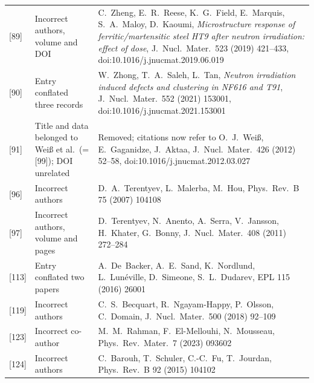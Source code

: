 \documentclass{article}
\begin{document}
\begin{itemize}
{\begin{longtable}{@{}p{}p{}p{}@{}}
{[89]} & Incorrect authors, volume and DOI & C.~Zheng, E.~R.~Reese, K.~G.~Field, E.~Marquis, S.~A.~Maloy, D.~Kaoumi, \emph{Microstructure response of ferritic/martensitic steel HT9 after neutron irradiation: effect of dose}, J.~Nucl.\ Mater.\ 523 (2019) 421--433, doi:10.1016/j.jnucmat.2019.06.019 \\
{[90]} & Entry conflated three records & W.~Zhong, T.~A.~Saleh, L.~Tan, \emph{Neutron irradiation induced defects and clustering in NF616 and T91}, J.~Nucl.\ Mater.\ 552 (2021) 153001, doi:10.1016/j.jnucmat.2021.153001 \\
{[91]} & Title and data belonged to Weiß et al.\ (= [99]); DOI unrelated & Removed; citations now refer to O.~J.~Weiß, E.~Gaganidze, J.~Aktaa, J.~Nucl.\ Mater.\ 426 (2012) 52--58, doi:10.1016/j.jnucmat.2012.03.027 \\
{[96]} & Incorrect authors & D.~A.~Terentyev, L.~Malerba, M.~Hou, Phys.\ Rev.\ B 75 (2007) 104108 \\
{[97]} & Incorrect authors, volume and pages & D.~Terentyev, N.~Anento, A.~Serra, V.~Jansson, H.~Khater, G.~Bonny, J.~Nucl.\ Mater.\ 408 (2011) 272--284 \\
{[113]} & Entry conflated two papers & A.~De~Backer, A.~E.~Sand, K.~Nordlund, L.~Lunéville, D.~Simeone, S.~L.~Dudarev, EPL 115 (2016) 26001 \\
{[119]} & Incorrect authors & C.~S.~Becquart, R.~Ngayam-Happy, P.~Olsson, C.~Domain, J.~Nucl.\ Mater.\ 500 (2018) 92--109 \\
{[123]} & Incorrect co-author & M.~M.~Rahman, F.~El-Mellouhi, N.~Mousseau, Phys.\ Rev.\ Mater.\ 7 (2023) 093602 \\
{[124]} & Incorrect authors & C.~Barouh, T.~Schuler, C.-C.~Fu, T.~Jourdan, Phys.\ Rev.\ B 92 (2015) 104102 \\
\end{longtable}
}


\end{itemize}
\end{document}
